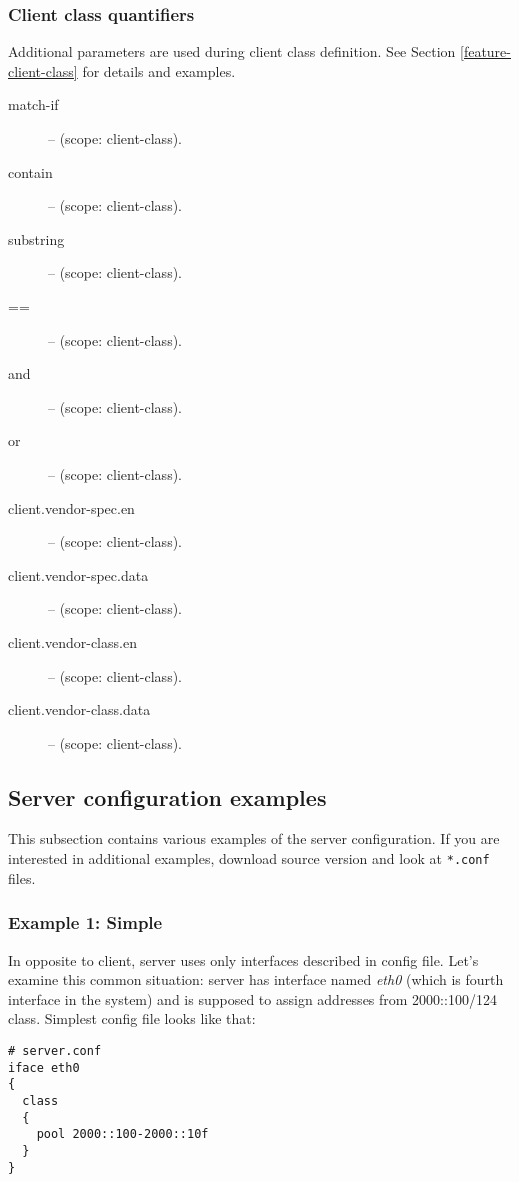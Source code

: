 \subsubsection{Client class quantifiers}
\label{class-expressions}
Additional parameters are used during client class definition. See
Section \ref{feature-client-class} for details and examples.

\begin{description}
\item[match-if] -- (scope: client-class). 
\item[contain] -- (scope: client-class).
\item[substring] -- (scope: client-class).
\item[==] -- (scope: client-class).
\item[and] -- (scope: client-class).
\item[or] -- (scope: client-class).
\item[client.vendor-spec.en] -- (scope: client-class).
\item[client.vendor-spec.data] -- (scope: client-class).
\item[client.vendor-class.en] -- (scope: client-class).
\item[client.vendor-class.data] -- (scope: client-class).
\end{description}


\subsection{Server configuration examples}

This subsection contains various examples of the server
configuration. If you are interested in additional examples, download
source version and look at \verb+*.conf+ files.

\subsubsection{Example 1: Simple}

In opposite to client, server uses only interfaces described in config
file. Let's examine this common situation: server has interface named
\emph{eth0} (which is fourth interface in the system) and is supposed
to assign addresses from 2000::100/124 class. Simplest config file
looks like that:

\begin{lstlisting}
# server.conf
iface eth0
{
  class
  {
    pool 2000::100-2000::10f
  }
}
\end{lstlisting}

